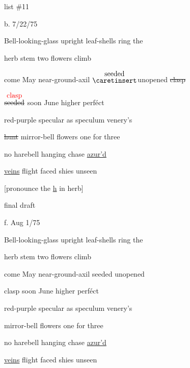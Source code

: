 \documentclass[a4paper]{article}
\begin{document}
\color{red}
\begin{minipage}{1cm}
\Circled{\color{blue}{13}} 
\end{minipage}
\begin{minipage}{7cm}
\color{blue}
list \#11 \hfill {}\par
\color{red}
b. 7/22/75 \hfill \Circled{\color{blue}{Venus's Looking-glass}}\par
\end{minipage}

\color{blue}



\begin{linenumbers} \draft
Bell-looking-glass upright leaf-shells ring the\par
herb \color{red}\textsuperscript{\Circled{*}} \color{blue} stem two flowers climb\par
come May near-ground-axil \color{red} $\stackrel{\hbox{seeded}}{\hbox{$\caretinsert$}}$\color{blue}unopened \st{clasp}\par
$\stackrel{\hbox{\color{red}{clasp}}}{\hbox{\st{seeded}}}$ soon June higher perf\'ect\par
red-purple specular as speculum venery's\par
\st{hunt} mirror-bell flowers one for three\par
no harebell hanging chase \ul{azur'd}\par
\ul{veins} flight faced shies unseen
\end{linenumbers}
\color{red}
[\textsuperscript{\Circled{*}}pronounce the \ul{h} in herb]
\par
{}
final draft\par
f. Aug 1/75\par

\color{blue}
\begin{linenumbers}
\draft
Bell-looking-glass upright leaf-shells ring the\par
herb stem two flowers climb\par
come May near-ground-axil seeded unopened\par
clasp soon June higher perf\'ect\par
red-purple specular as speculum venery's\par
mirror-bell flowers one for three\par
no harebell hanging chase \ul{azur'd}\par
\ul{veins} flight faced shies unseen
\end{linenumbers}
\end{document}
